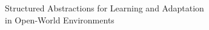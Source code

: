 \thispagestyle{plain}
\vspace*{\fill}
\begin{center}
  {\Large Structured Abstractions for Learning and Adaptation\\
  in Open-World Environments\par}
\end{center}
\vspace*{\fill}
\clearpage
